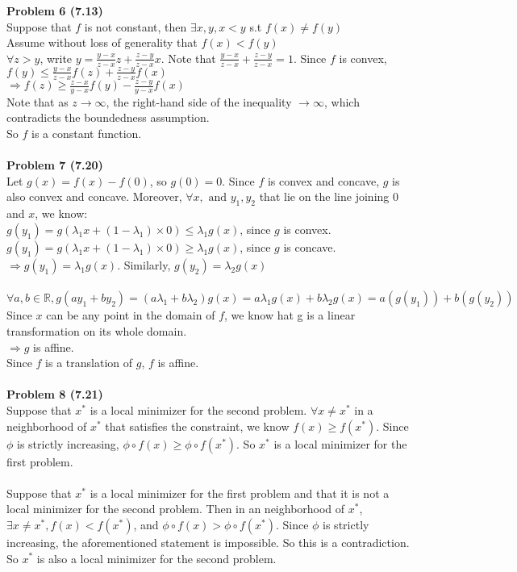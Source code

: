 \documentclass[letterpaper,12pt]{article}
\theoremstyle{definition}
\begin{document}
\noindent\textbf{Problem 6 (7.13)} \\
Suppose that $f$ is not constant, then $\exists x,y, x<y$ s.t $f(x) \neq f(y)$\\
Assume without loss of generality that $f(x) < f(y)$\\
$\forall z>y$, write $y = \frac{y-x}{z-x}z + \frac{z-y}{z-x}x$. Note that $\frac{y-x}{z-x} + \frac{z-y}{z-x} = 1$. Since $f$ is convex, \\
$f(y) \leq \frac{y-x}{z-x}f(z) + \frac{z-y}{z-x}f(x)$\\
$\Rightarrow f(z)\geq \frac{z-x}{y-x}f(y) - \frac{z-y}{y-x}f(x)$\\
Note that as $z\rightarrow \infty$, the right-hand side of the inequality $\rightarrow \infty$, which contradicts the boundedness assumption.\\
So $f$ is a constant function.\\
\\
\noindent\textbf{Problem 7 (7.20)} \\
Let $g(x) = f(x)- f(0)$, so $g(0) = 0$. Since $f$ is convex and concave, $g$ is also convex and concave. Moreover, $\forall x, \text{ and }y_1, y_2$ that lie on the line joining $0$ and $x$, we know:\\
$g(y_1) = g(\lambda_1 x + (1-\lambda_1)\times 0)\leq \lambda_1g(x)$, since $g$ is convex.\\
$g(y_1) = g(\lambda_1 x + (1-\lambda_1)\times 0)\geq \lambda_1g(x)$, since $g$ is concave.\\
$\Rightarrow g(y_1) = \lambda_1g(x)$. Similarly, $g(y_2) = \lambda_2g(x)$\\
\\
$\forall a, b\in \mathbb{R}, g(ay_1+by_2) = (a\lambda_1+b\lambda_2)g(x)=a\lambda_1g(x)+b\lambda_2g(x)=a(g(y_1))+b(g(y_2))$\\
Since $x$ can be any point in the domain of $f$, we know hat g is a linear transformation on its whole domain.\\
$\Rightarrow g$ is affine.\\
Since $f$ is a translation of $g$, $f$ is affine. \\
\\
\noindent\textbf{Problem 8 (7.21)}\\
Suppose that $x^*$ is a local minimizer for the second problem. $\forall x\neq x^*$ in a neighborhood of $x^*$ that satisfies the constraint, we know $f(x)\geq f(x^*)$. Since $\phi$ is strictly increasing, $\phi\circ f(x)\geq \phi\circ f(x^*)$. So $x^*$ is a local minimizer for the first problem.\\
\\
Suppose that $x^*$ is a local minimizer for the first problem and that it is not a local minimizer for the second problem. Then in an neighborhood of $x^*$, $\exists x\neq x^*, f(x)<f(x^*) $, and $\phi\circ f(x) > \phi\circ f(x^*)$. Since $\phi$ is strictly increasing, the aforementioned statement is impossible. So this is a contradiction. So $x^*$ is also a local minimizer for the second problem.
\end{document}
